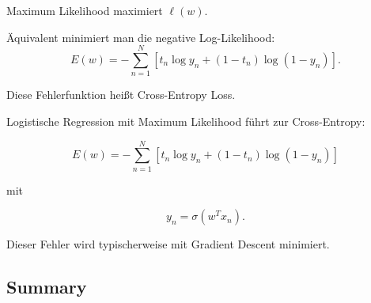 \documentclass[11pt,a4paper]{scrartcl}
\begin{document}
\begin{calculationbox}
    Maximum Likelihood maximiert \(\ell(w)\).

    Äquivalent minimiert man die negative Log-Likelihood:
    \[
        E(w)
        =
        -
        \sum_{n=1}^{N}
        \left[
            t_n\log y_n
            +
            (1-t_n)\log(1-y_n)
        \right].
    \]

    Diese Fehlerfunktion heißt Cross-Entropy Loss.
\end{calculationbox}

\begin{answerbox}
    Logistische Regression mit Maximum Likelihood führt zur Cross-Entropy:

    \[
        \boxed{
            E(w)
            =
            -
            \sum_{n=1}^{N}
            \left[
                t_n\log y_n
                +
                (1-t_n)\log(1-y_n)
            \right]
        }
    \]

    mit

    \[
        \boxed{
            y_n
            =
            \sigma(w^Tx_n).
        }
    \]

    Dieser Fehler wird typischerweise mit Gradient Descent minimiert.
\end{answerbox}

\subsection{Summary}
\end{document}
